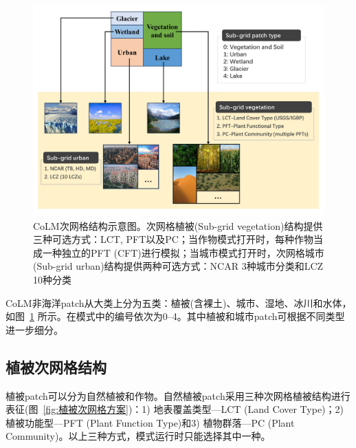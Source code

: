 {
\begin{figure}[htbp]
\centering
\includegraphics[width=\textwidth]{Figures/模式构架/CoLM次网格结构示意图-v2.jpg}
\caption[CoLM次网格结构示意图]{CoLM次网格结构示意图。次网格植被(Sub-grid vegetation)结构提供三种可选方式：LCT, PFT以及PC；当作物模式打开时，每种作物当成一种独立的PFT (CFT)进行模拟；当城市模式打开时，次网格城市(Sub-grid urban)结构提供两种可选方式：NCAR 3种城市分类和LCZ 10种分类}
\label{fig:次网格结构示意图}
\end{figure}
}


CoLM非海洋patch从大类上分为五类：植被(含裸土)、城市、湿地、冰川和水体，如图~\ref{fig:次网格结构示意图} 所示。在模式中的编号依次为0--4。其中植被和城市patch可根据不同类型进一步细分。

\subsection{植被次网格结构}
植被patch可以分为自然植被和作物。自然植被patch采用三种次网格植被结构进行表征(图~\ref{fig:植被次网格方案})：1) 地表覆盖类型---LCT (Land Cover Type)；2) 植被功能型---PFT (Plant Function Type)和3) 植物群落---PC (Plant Community)。以上三种方式，模式运行时只能选择其中一种。

